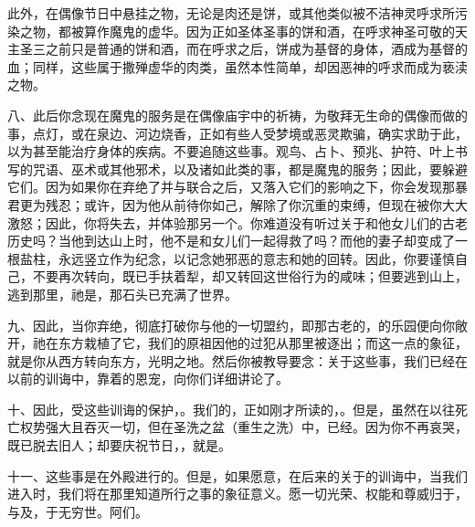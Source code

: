 此外，在偶像节日中悬挂之物，无论是肉还是饼，或其他类似被不洁神灵呼求所污染之物，都被算作魔鬼的虚华。因为正如圣体圣事的饼和酒，在呼求神圣可敬的天主圣三之前只是普通的饼和酒，而在呼求之后，饼成为基督的身体，酒成为基督的血；同样，这些属于撒殚虚华的肉类，虽然本性简单，却因恶神的呼求而成为亵渎之物。\par

八、此后你念现在魔鬼的服务是在偶像庙宇中的祈祷，为敬拜无生命的偶像而做的事，点灯，或在泉边、河边烧香，正如有些人受梦境或恶灵欺骗，确实求助于此，以为甚至能治疗身体的疾病。不要追随这些事。观鸟、占卜、预兆、护符、叶上书写的咒语、巫术或其他邪术，以及诸如此类的事，都是魔鬼的服务；因此，要躲避它们。因为如果你在弃绝了并与联合之后，又落入它们的影响之下，你会发现那暴君更为残忍；或许，因为他从前待你如己，解除了你沉重的束缚，但现在被你大大激怒；因此，你将失去，并体验那另一个。你难道没有听过关于和他女儿们的古老历史吗？当他到达山上时，他不是和女儿们一起得救了吗？而他的妻子却变成了一根盐柱，永远竖立作为纪念，以记念她邪恶的意志和她的回转。因此，你要谨慎自己，不要再次转向，既已手扶着犁，却又转回这世俗行为的咸味；但要逃到山上，逃到那里，祂是，那石头已充满了世界。\par

九、因此，当你弃绝，彻底打破你与他的一切盟约，即那古老的，的乐园便向你敞开，祂在东方栽植了它，我们的原祖因他的过犯从那里被逐出；而这一点的象征，就是你从西方转向东方，光明之地。然后你被教导要念：关于这些事，我们已经在以前的训诲中，靠着的恩宠，向你们详细讲论了。\par

十、因此，受这些训诲的保护，。我们的，正如刚才所读的，。但是，虽然在以往死亡权势强大且吞灭一切，但在圣洗之盆（重生之洗）中，已经。因为你不再哀哭，既已脱去旧人；却要庆祝节日，，就是。\par

十一、这些事是在外殿进行的。但是，如果愿意，在后来的关于的训诲中，当我们进入时，我们将在那里知道所行之事的象征意义。愿一切光荣、权能和尊威归于，与及，于无穷世。阿们。\par

